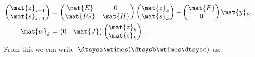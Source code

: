\begin{equation*}
    \label{eq:dlin-6}
    \begin{aligned}
        \begin{pmatrix}
            \mat{z}_{k+1} \\
            \mat{s}_{k+1}
        \end{pmatrix} & =
        \begin{pmatrix}
            \mat{E}  & 0       \\
            \mat{IG} & \mat{H}
        \end{pmatrix}\begin{pmatrix}
                         \mat{z}_k \\ \mat{s}_k
                     \end{pmatrix}+
        \begin{pmatrix}
            \mat{F} \\ 0
        \end{pmatrix}\mat{y}_k,                                \\
        \mat{w}_k        & =\begin{pmatrix}
                                0 & \mat{J}
                            \end{pmatrix}\begin{pmatrix}
                                             \mat{z}_k \\ \mat{s}_k
                                         \end{pmatrix}.
    \end{aligned}
\end{equation*}
From this we can write~$\dtsysa\mtimes (\dtsysb\mtimes \dtsysc)$ as:
